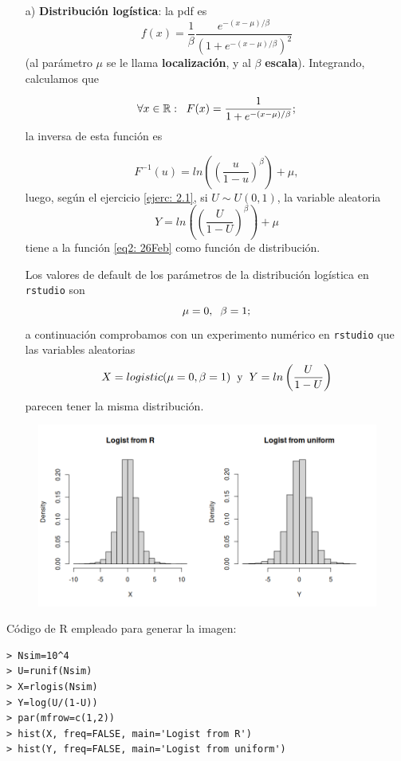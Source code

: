 \begin{itemize}
\item[a)] \textbf{Distribución logística}: la pdf es
\begin{equation}
\label{eq2: 26Feb}
f(x)= \frac{1}{\beta} \frac{e^{-(x- \mu)/ \beta}}{(1+e^{-(x- \mu)/ \beta})^{2}}
\end{equation}
(al parámetro $\mu$ se le llama \textbf{localización}, y al $\beta$
\textbf{escala}). Integrando, calculamos que

\[
\forall x \in \mathbb{R} : \hspace{0.2cm}
F(x)= \frac{1}{1+e^{-(x-\mu)/\beta}};
\]
la inversa de esta función es 

\[
F^{-1}(u)= ln \left( \left( \frac{u}{1-u}  \right)^{\beta} \right) + \mu,
\]
luego, según el ejercicio \ref{ejerc: 2.1}, si $U \sim U(0,1)$, la variable
aleatoria
\[
Y = ln \left( \left( \frac{U}{1-U}  \right)^{\beta} \right) + \mu
\]
tiene a la función \eqref{eq2: 26Feb} como función de distribución.

Los valores de default de los parámetros de la distribución logística
en \texttt{rstudio} son 
\[
\mu=0, \hspace{0.2cm} \beta=1;
\]
a continuación comprobamos con un experimento numérico
en \texttt{rstudio} que las variables aleatorias
\begin{equation}
\label{eq3: 26Feb}
X = logistic(\mu=0, \beta=1) \hspace{0.2cm} \text{y}
\hspace{0.2cm} Y= ln \left( \frac{U}{1-U} \right)
\end{equation}
parecen tener la misma distribución.
\end{itemize}

\begin{figure}[H]
\centering
	\includegraphics[scale=0.5]{logistic} 
\end{figure}
Código de R empleado para generar la imagen:
\begin{verbatim}
> Nsim=10^4
> U=runif(Nsim)
> X=rlogis(Nsim)
> Y=log(U/(1-U))
> par(mfrow=c(1,2))
> hist(X, freq=FALSE, main='Logist from R')
> hist(Y, freq=FALSE, main='Logist from uniform')
\end{verbatim}


\vspace{0.2cm}






